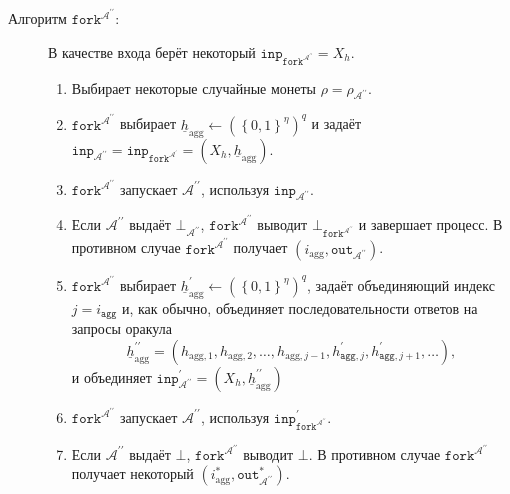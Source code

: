 \documentclass{mrl}
\theoremstyle{definition}
\numberwithin{theorem}{subsection}
\newcommand{\adversary}{\mathcal{A}}
\begin{document}
\begin{description}

\item [Алгоритм $\texttt{fork}^{\adversary^{\prime \prime}}$:] В качестве входа берёт некоторый $\texttt{inp}_{\texttt{fork}^{\adversary^{\prime \prime}}} = X_h$.
\begin{enumerate}
\item Выбирает некоторые случайные монеты $\rho = \rho_{\adversary^{\prime \prime}}$.

\item $\texttt{fork}^{\adversary^{\prime \prime}}$ выбирает $\underline{h}_{\text{agg}} \leftarrow (\left\{0,1\right\}^{\eta})^q$ и задаёт $\texttt{inp}_{\adversary^{\prime\prime}} = \texttt{inp}_{\texttt{fork}^{\adversary^\prime}} = (X_h, \underline{h}_{\text{agg}})$.

\item $\texttt{fork}^{\adversary^{\prime \prime}}$ запускает $\adversary^{\prime\prime}$, используя $\texttt{inp}_{\adversary^{\prime\prime}}$.

\item Если $\adversary^{\prime\prime}$ выдаёт $\bot_{\adversary^{\prime\prime}}$, $\texttt{fork}^{\adversary^{\prime \prime}}$ выводит $\bot_{\texttt{fork}^{\adversary^{\prime \prime}}}$ и завершает процесс. В противном случае $\texttt{fork}^{\adversary^{\prime \prime}}$ получает $(i_{\text{agg}}, \texttt{out}_{\adversary^{\prime \prime}})$.

\item $\texttt{fork}^{\adversary^{\prime \prime}}$ выбирает $\underline{h}_{\text{agg}}^{\prime} \leftarrow (\left\{0,1\right\}^\eta)^q$, задаёт объединяющий индекс $j = i_{\texttt{agg}}$ и, как обычно, объединяет последовательности ответов на запросы оракула \[\underline{h}_{\text{agg}}^{\prime \prime}= (h_{\text{agg},1}, h_{\text{agg},2}, \ldots, h_{\text{agg}, j - 1}, h^{\prime}_{\texttt{agg}, j}, h^{\prime}_{\texttt{agg}, j+1}, \ldots),\] и объединяет $\texttt{inp}^{\prime}_{\adversary^{\prime \prime}} = (X_h, \underline{h}_{\text{agg}}^{\prime \prime})$

\item $\texttt{fork}^{\adversary^{\prime \prime}}$ запускает $\adversary^{\prime \prime}$, используя $\texttt{inp}^{\prime}_{\texttt{fork}^{\adversary^{\prime \prime}}}$.

\item Если $\adversary^{\prime \prime}$ выдаёт $\bot$, $\texttt{fork}^{\adversary^{\prime \prime}}$ выводит $\bot$. В противном случае $\texttt{fork}^{\adversary^{\prime \prime}}$ получает некоторый $(i_{\text{agg}}^*, \texttt{out}_{\adversary^{\prime \prime}}^*)$.


\end{enumerate}
\end{description}
\end{document}
